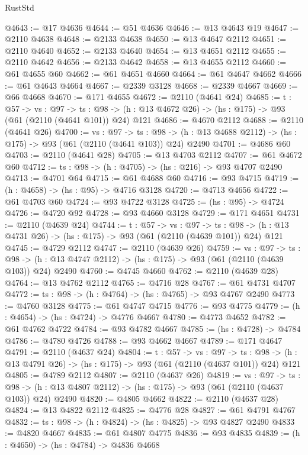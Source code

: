 \begin{lexlean}{RustStd}
\begin{coremodule}
@4643 := @17 @4636
@4644 := @51 @4636
@4646 := @13 @4643 @19
@4647 := @2110 @4638
@4648 := @2133 @4638
@4650 := @13 @4647 @2112
@4651 := @2110 @4640
@4652 := @2133 @4640
@4654 := @13 @4651 @2112
@4655 := @2110 @4642
@4656 := @2133 @4642
@4658 := @13 @4655 @2112
@4660 := @61 @4655 @60
@4662 := @61 @4651 @4660
@4664 := @61 @4647 @4662
@4666 := @61 @4643 @4664
@4667 := @2339 @3128
@4668 := @2339 @4667
@4669 := @66 @4668
@4670 := @171 @4655
@4672 := @2110 (@4641 @24)
@4685 := {t : @57} ->
  {vs : @97} ->
  {ts : @98} -> (h : @13 @4672 @26) -> (hs : @175) -> @93 (@61 (@2110 (@4641 @101)) @24) @121
@4686 := @4670 @2112
@4688 := @2110 (@4641 @26)
@4700 := {vs : @97} ->
  {ts : @98} -> (h : @13 @4688 @2112) -> (hs : @175) -> @93 (@61 (@2110 (@4641 @103)) @24) @2490
@4701 := @4686 @60
@4703 := @2110 (@4641 @28)
@4705 := @13 @4703 @2112
@4707 := @61 @4672 @60
@4712 := {ts : @98} -> (h : @4705) -> (hs : @216) -> @93 @4707 @2490
@4713 := @4701 @64
@4715 := @61 @4688 @60
@4716 := @93 @4715
@4719 := (h : @4658) -> (hs : @95) -> @4716 @3128
@4720 := @4713 @4656
@4722 := @61 @4703 @60
@4724 := @93 @4722 @3128
@4725 := (hs : @95) -> @4724
@4726 := @4720 @92
@4728 := @93 @4660 @3128
@4729 := @171 @4651
@4731 := @2110 (@4639 @24)
@4744 := {t : @57} ->
  {vs : @97} ->
  {ts : @98} -> (h : @13 @4731 @26) -> (hs : @175) -> @93 (@61 (@2110 (@4639 @101)) @24) @121
@4745 := @4729 @2112
@4747 := @2110 (@4639 @26)
@4759 := {vs : @97} ->
  {ts : @98} -> (h : @13 @4747 @2112) -> (hs : @175) -> @93 (@61 (@2110 (@4639 @103)) @24) @2490
@4760 := @4745 @4660
@4762 := @2110 (@4639 @28)
@4764 := @13 @4762 @2112
@4765 := @4716 @28
@4767 := @61 @4731 @4707
@4772 := {ts : @98} -> (h : @4764) -> (hs : @4765) -> @93 @4767 @2490
@4773 := @4760 @3128
@4775 := @61 @4747 @4715
@4776 := @93 @4775
@4779 := (h : @4654) -> (hs : @4724) -> @4776 @4667
@4780 := @4773 @4652
@4782 := @61 @4762 @4722
@4784 := @93 @4782 @4667
@4785 := (hs : @4728) -> @4784
@4786 := @4780 @4726
@4788 := @93 @4662 @4667
@4789 := @171 @4647
@4791 := @2110 (@4637 @24)
@4804 := {t : @57} ->
  {vs : @97} ->
  {ts : @98} -> (h : @13 @4791 @26) -> (hs : @175) -> @93 (@61 (@2110 (@4637 @101)) @24) @121
@4805 := @4789 @2112
@4807 := @2110 (@4637 @26)
@4819 := {vs : @97} ->
  {ts : @98} -> (h : @13 @4807 @2112) -> (hs : @175) -> @93 (@61 (@2110 (@4637 @103)) @24) @2490
@4820 := @4805 @4662
@4822 := @2110 (@4637 @28)
@4824 := @13 @4822 @2112
@4825 := @4776 @28
@4827 := @61 @4791 @4767
@4832 := {ts : @98} -> (h : @4824) -> (hs : @4825) -> @93 @4827 @2490
@4833 := @4820 @4667
@4835 := @61 @4807 @4775
@4836 := @93 @4835
@4839 := (h : @4650) -> (hs : @4784) -> @4836 @4668

\end{coremodule}
\end{lexlean}
